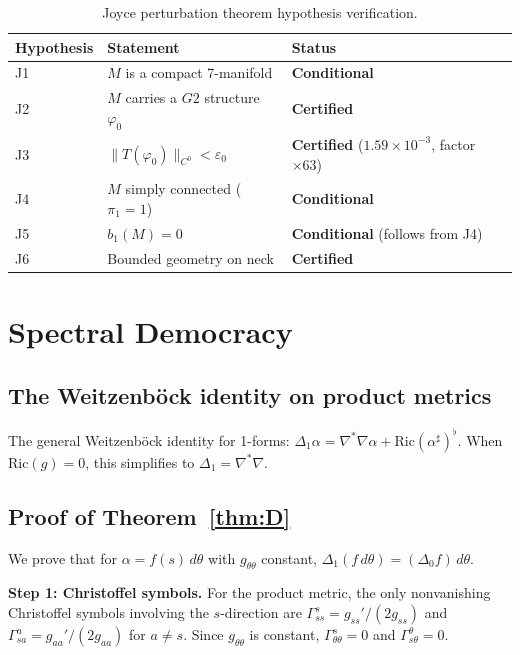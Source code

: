 \documentclass[11pt,a4paper]{article}
\theoremstyle{definition}
\theoremstyle{remark}
\newcommand{\Gtwo}{\mathrm{G}_2}
\def\Gtwo{G2}%
\begin{document}
\begin{table}[ht]
\centering
\small
\begin{tabular}{llll}
\toprule
Hypothesis & Statement & Status \\
\midrule
J1 & $M$ is a compact 7-manifold & \textbf{Conditional} \\
J2 & $M$ carries a $\Gtwo$ structure $\varphi_0$ & \textbf{Certified} \\
J3 & $\|T(\varphi_0)\|_{C^0} < \varepsilon_0$ & \textbf{Certified} ($1.59 \times 10^{-3}$, factor $\times 63$) \\
J4 & $M$ simply connected ($\pi_1 = 1$) & \textbf{Conditional} \\
J5 & $b_1(M) = 0$ & \textbf{Conditional} (follows from J4) \\
J6 & Bounded geometry on neck & \textbf{Certified} \\
\bottomrule
\end{tabular}
\caption{Joyce perturbation theorem hypothesis verification.}
\end{table}

\section{Spectral Democracy}\label{sec:democracy}

\subsection{The Weitzenb\"ock identity on product metrics}

The general Weitzenb\"ock identity for 1-forms: $\Delta_1 \alpha = \nabla^* \nabla \alpha + \mathrm{Ric}(\alpha^\sharp)^\flat$. When $\mathrm{Ric}(g) = 0$, this simplifies to $\Delta_1 = \nabla^* \nabla$.

\subsection{Proof of Theorem~\ref{thm:D}}

We prove that for $\alpha = f(s)\,d\theta$ with $g_{\theta\theta}$ constant, $\Delta_1(f\,d\theta) = (\Delta_0 f)\,d\theta$.

\textbf{Step 1: Christoffel symbols.} For the product metric, the only nonvanishing Christoffel symbols involving the $s$-direction are $\Gamma^s_{ss} = g_{ss}'/(2g_{ss})$ and $\Gamma^a_{sa} = g_{aa}'/(2g_{aa})$ for $a \neq s$. Since $g_{\theta\theta}$ is constant, $\Gamma^s_{\theta\theta} = 0$ and $\Gamma^\theta_{s\theta} = 0$.
\end{document}
